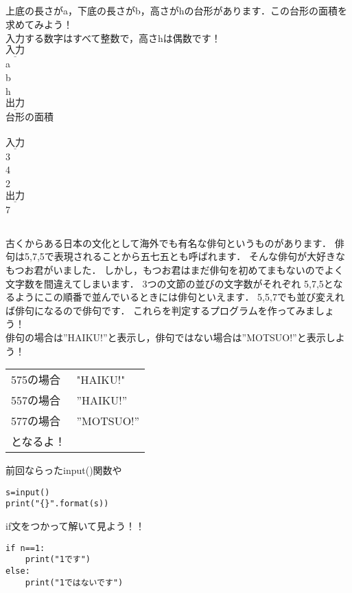 \documentclass[dvipdfmx]{jsarticle}
\begin{document}
\subsection{}
上底の長さがa，下底の長さがb，高さがhの台形があります．この台形の面積を求めてみよう！\\
入力する数字はすべて整数で，高さhは偶数です！\\
$\underline{入力}$\\
a\\
b\\
h\\
$\underline{出力}$\\
台形の面積\\
\\
$\underline{入力}$\\
3\\
4\\
2\\
$\underline{出力}$\\
7\\
\subsection{}
古くからある日本の文化として海外でも有名な俳句というものがあります．
俳句は5,7,5で表現されることから五七五とも呼ばれます．
そんな俳句が大好きなもつお君がいました．
しかし，もつお君はまだ俳句を初めてまもないのでよく文字数を間違えてしまいます．
3つの文節の並びの文字数がそれぞれ 5,7,5となるようにこの順番で並んでいるときには俳句といえます．
5,5,7でも並び変えれば俳句になるので俳句です．
これらを判定するプログラムを作ってみましょう！\\
俳句の場合は”HAIKU!”と表示し，俳句ではない場合は”MOTSUO!”と表示しよう！\\
\begin{table}[H]
  \begin{tabular}{ll}
    575の場合 & "HAIKU!"\\
    557の場合 & ”HAIKU!”\\
    577の場合 & ”MOTSUO!”\\
    となるよ！
  \end{tabular}
\end{table}
前回ならったinput()関数や
\begin{lstlisting} 
s=input()
print("{}".format(s))
\end{lstlisting}
if文をつかって解いて見よう！！
\begin{lstlisting} 
if n==1:
	print("1です")
else:
	print("1ではないです")
\end{lstlisting}
\end{document}
